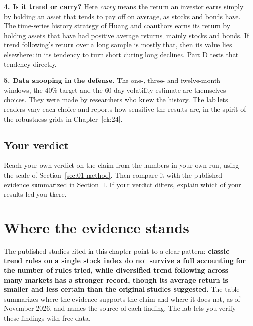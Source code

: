 \textbf{4. Is it trend or carry?} Here \emph{carry} means the return an investor earns simply by holding an asset that tends to pay off on average, as stocks and bonds have. The time-series history strategy of Huang and coauthors earns its return by holding assets that have had positive average returns, mainly stocks and bonds. If trend following's return over a long sample is mostly that, then its value lies elsewhere: in its tendency to turn short during long declines. Part D tests that tendency directly.

\textbf{5. Data snooping in the defense.} The one-, three- and twelve-month windows, the 40\% target and the 60-day volatility estimate are themselves choices. They were made by researchers who knew the history. The lab lets readers vary each choice and reports how sensitive the results are, in the spirit of the robustness grids in Chapter~\ref{ch:24}.

\subsection*{Your verdict}

Reach your own verdict on the claim from the numbers in your own run, using the scale of Section~\ref{sec:01-method}. Then compare it with the published evidence summarized in Section~\ref{sec:08-verdict}. If your verdict differs, explain which of your results led you there.

\section{Where the evidence stands}
\label{sec:08-verdict}

The published studies cited in this chapter point to a clear pattern: \textbf{classic trend rules on a single stock index do not survive a full accounting for the number of rules tried, while diversified trend following across many markets has a stronger record, though its average return is smaller and less certain than the original studies suggested.} The table summarizes where the evidence supports the claim and where it does not, as of November 2026, and names the source of each finding. The lab lets you verify these findings with free data.

